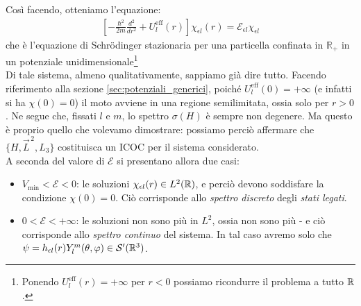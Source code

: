 \documentclass[../../FisicaTeorica.tex]{subfiles}
\begin{document}
Così facendo, otteniamo l'equazione:
\begin{align*}
\left[-\frac{\hbar^2}{2m}\frac{d^2}{dr^2} + U_l^{\mathrm{eff}}(r)\right]\chi_{\epsilon l}(r)=\mathcal{E}_{\epsilon l} \chi_{\epsilon l}
\end{align*}
che è l'equazione di Schr\"odinger stazionaria per una particella confinata in $\mathbb{R}_+$ in un potenziale unidimensionale\footnote{Ponendo $U_{l}^{\mathrm{eff}}(r)=+\infty$ per $r<0$ possiamo ricondurre il problema a tutto $\mathbb{R}$.}\\
Di tale sistema, almeno qualitativamente, sappiamo già dire tutto. Facendo riferimento alla sezione \ref{sec:potenziali_generici}, poiché $U_l^\mathrm{eff}(0)=+\infty$ (e infatti si ha $\chi(0)=0$) il moto avviene in una regione semilimitata, ossia solo per $r>0$. Ne segue che, fissati $l$ e $m$, lo spettro $\sigma(H)$ è sempre non degenere. Ma questo è proprio quello che volevamo dimostrare: possiamo perciò affermare che $\{H, \vec{L}^{\,2},L_3\}$ costituisca un ICOC per il sistema considerato.\\
A seconda del valore di $\mathcal{E}$ si presentano allora due casi:
\begin{itemize}
\item $V_{\min} < \mathcal{E} < 0$: le soluzioni $\chi_{\epsilon l}(r) \in L^2(\mathbb{R})$, e perciò devono soddisfare la condizione $\chi(0)=0$. Ciò corrisponde allo \textit{spettro discreto} degli \textit{stati legati}.
\item $0 < \mathcal{E} < +\infty$: le soluzioni non sono più in $L^2$, ossia non sono più  - e ciò corrisponde allo \textit{spettro continuo} del sistema. In tal caso avremo solo che $\psi=h_{\epsilon l}(r)Y_l^m(\theta,\varphi) \in \mathcal{S}'(\mathbb{R}^3)$.
\end{itemize}
\end{document}
